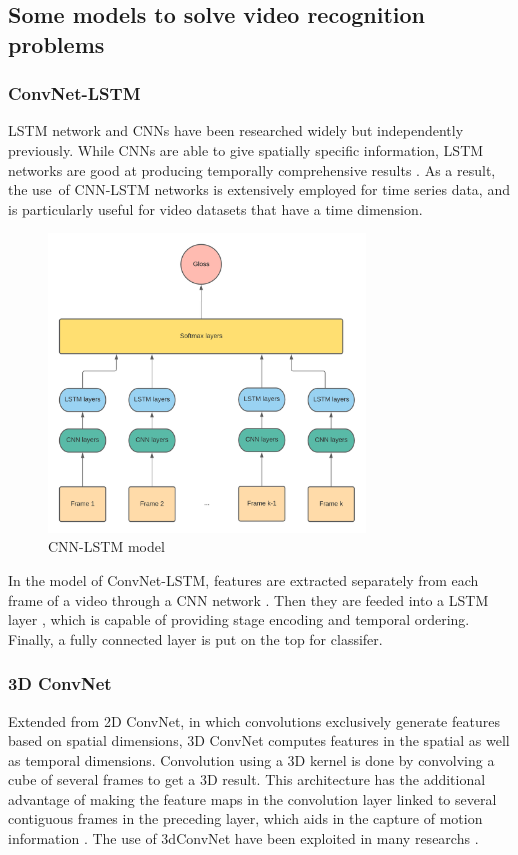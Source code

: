 \documentclass[a4paper, 12pt]{article}
\begin{document}
\subsection{Some models to solve video recognition problems}
\subsubsection{ConvNet-LSTM}
LSTM network and CNNs have been researched widely but independently previously. While CNNs are able to give spatially specific information, LSTM networks are good at producing temporally comprehensive results \citep{mutegeki2020cnn}. As a result, the use of CNN-LSTM networks is extensively employed for time series data, and is particularly useful for video datasets that have a time dimension.

\begin{figure}[H]
    \centering
    \includegraphics[width=0.75\textwidth]{CNN-LSTM.png}
    \caption{CNN-LSTM model}
    \label{Figure CNN-LSTM}
\end{figure}

In the model of ConvNet-LSTM, features are extracted separately from each frame of a video through a CNN network \citep{karpathy2014large}. Then they are feeded into a LSTM layer \citep{yue2015beyond,donahue2015long}, which is capable of providing stage encoding and temporal ordering. Finally, a fully connected layer is put on the top for classifer.

\subsubsection{3D ConvNet}
Extended from 2D ConvNet, in which convolutions exclusively generate features based on spatial dimensions, 3D ConvNet computes features in the spatial as well as temporal dimensions. Convolution using a 3D kernel is done by convolving a cube of several frames to get a 3D result. This architecture has the additional advantage of making the feature maps in the convolution layer linked to several contiguous frames in the preceding layer, which aids in the capture of motion information \citep{Ji20133DCN}. The use of 3dConvNet have been exploited in many researchs \citep{tran2015learning,taylor2010convolutional}. 
\end{document}
